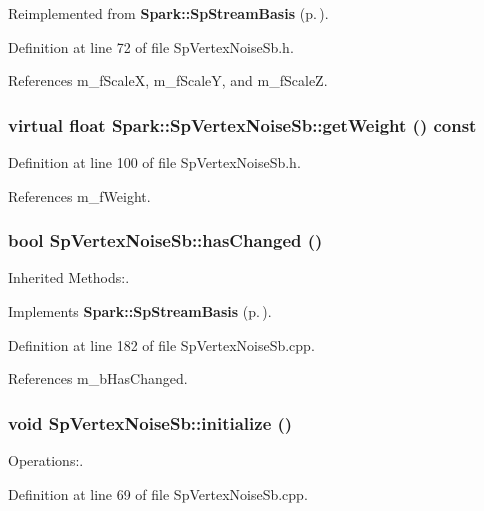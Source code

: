 Reimplemented from {\bf Spark::Sp\-Stream\-Basis} {\rm (p.\,\pageref{classSpark_1_1SpStreamBasis_a9})}.

Definition at line 72 of file Sp\-Vertex\-Noise\-Sb.h.

References m\_\-f\-Scale\-X, m\_\-f\-Scale\-Y, and m\_\-f\-Scale\-Z.
\subsubsection{\setlength{\rightskip}{0pt plus 5cm}virtual float Spark::Sp\-Vertex\-Noise\-Sb::get\-Weight () const\hspace{0.3cm}{\tt  [inline, virtual]}}\label{classSpark_1_1SpVertexNoiseSb_a12}


Definition at line 100 of file Sp\-Vertex\-Noise\-Sb.h.

References m\_\-f\-Weight.
\subsubsection{\setlength{\rightskip}{0pt plus 5cm}bool Sp\-Vertex\-Noise\-Sb::has\-Changed ()\hspace{0.3cm}{\tt  [virtual]}}\label{classSpark_1_1SpVertexNoiseSb_a15}


Inherited Methods:. 



Implements {\bf Spark::Sp\-Stream\-Basis} {\rm (p.\,\pageref{classSpark_1_1SpStreamBasis_a2})}.

Definition at line 182 of file Sp\-Vertex\-Noise\-Sb.cpp.

References m\_\-b\-Has\-Changed.
\subsubsection{\setlength{\rightskip}{0pt plus 5cm}void Sp\-Vertex\-Noise\-Sb::initialize ()}\label{classSpark_1_1SpVertexNoiseSb_a2}


Operations:. 

Definition at line 69 of file Sp\-Vertex\-Noise\-Sb.cpp.

